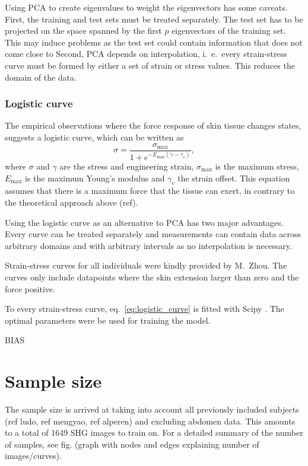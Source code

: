 Using PCA to create eigenvalues to weight the eigenvectors has some caveats.
First, the training and test sets must be treated separately.
The test set has to be projected on the space spanned by the first $p$ eigenvectors of the training set.
This may induce problems as the test set could contain information that does not come close to
Second, PCA depends on interpolation, i.\ e.\ every strain-stress curve must be formed by either a set of strain or stress values.
This reduces the domain of the data.

\subsubsection{Logistic curve}
The empirical observations where the force response of skin tissue changes states, suggests a logistic curve, which can be written as
\begin{equation}\label{eq:logistic_curve}
    \sigma = \frac{\sigma_\mathrm{max}}{1+e^{-E_\mathrm{max} (\gamma - \gamma_c)}},
\end{equation}
where $\sigma$ and $\gamma$ are the stress and engineering strain, $\sigma_\mathrm{max}$ is the maximum stress, $E_\mathrm{max}$ is the maximum Young's modulus and $\gamma_c$ the strain offset.
This equation assumes that there is a maximum force that the tissue can exert, in contrary to the theoretical approach above (ref).

Using the logistic curve as an alternative to PCA has two major advantages.
Every curve can be treated separately and measurements can contain data across arbitrary domains and with arbitrary intervals as no interpolation is necessary.

Strain-stress curves for all individuals were kindly provided by M.\ Zhou.
The curves only include datapoints where the skin extension larger than zero and the force positive.

To every strain-stress curve, eq.~\ref{eq:logistic_curve} is fitted with Scipy \cite{2020SciPy-NMeth}.
The optimal parameters were be used for training the model.

BIAS

\section{Sample size}
The sample size is arrived at taking into account all previously included subjects (ref ludo, ref mengyao, ref alperen) and excluding abdomen data.
This amounts to a total of 1649 SHG images to train on.
For a detailed summary of the number of samples, see fig. (graph with nodes and edges explaining number of images/curves).

